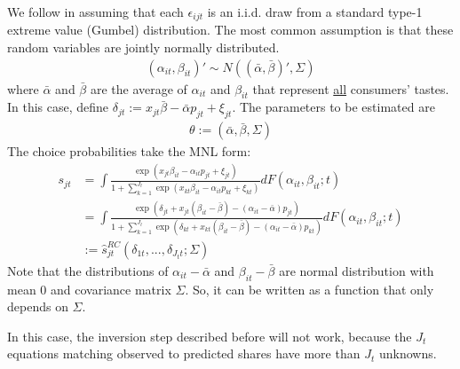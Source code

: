 \documentclass[11pt]{elegantbook}
\begin{document}
We follow \cite{berry1995automobile} in assuming that each $\epsilon_{ijt}$ is an i.i.d. draw from a standard type-1 extreme value (Gumbel) distribution. The most common assumption is that these random variables are jointly normally distributed.
\begin{equation}
    \begin{aligned}
        (\alpha_{it},\beta_{it})'\sim N\left((\bar{\alpha},\bar{\beta})',\Sigma\right)
    \end{aligned}
    \nonumber
\end{equation}
where $\bar{\alpha}$ and $\bar{\beta}$ are the average of $\alpha_{it}$ and $\beta_{it}$ that represent \underline{all} consumers' tastes. In this case, define $\delta_{jt}:=x_{jt}\bar{\beta}-\bar{\alpha}p_{jt}+\xi_{jt}$. The parameters to be estimated are
\begin{equation}
    \begin{aligned}
        \theta:=(\bar{\alpha},\bar{\beta},\Sigma)
    \end{aligned}
    \nonumber
\end{equation}
The choice probabilities take the MNL form:
\begin{equation}
    \begin{aligned}
        s_{jt}&=\int \frac{\exp(x_{jt}\beta_{it}-\alpha_{it}p_{jt}+\xi_{jt})}{1+\sum_{k=1}^{J_t}\exp(x_{kt}\beta_{it}-\alpha_{it}p_{kt}+\xi_{kt})}d F(\alpha_{it},\beta_{it};t)\\
        &=\int \frac{\exp(\delta_{jt}+x_{jt}(\beta_{it}-\bar{\beta})-(\alpha_{it}-\bar{\alpha})p_{jt})}{1+\sum_{k=1}^{J_t}\exp(\delta_{kt}+x_{kt}(\beta_{it}-\bar{\beta})-(\alpha_{it}-\bar{\alpha})p_{kt})}d F(\alpha_{it},\beta_{it};t)\\
        &:=\hat{s}_{jt}^{RC}\left(\delta_{1t},...,\delta_{J_tt};\Sigma\right)
    \end{aligned}
    \nonumber
\end{equation}
Note that the distributions of $\alpha_{it}-\bar{\alpha}$ and $\beta_{it}-\bar{\beta}$ are normal distribution with mean $0$ and covariance matrix $\Sigma$. So, it can be written as a function that only depends on $\Sigma$.

In this case, the inversion step described before will not work, because the $J_t$ equations matching observed to predicted shares have more than $J_t$ unknowns.
\end{document}
